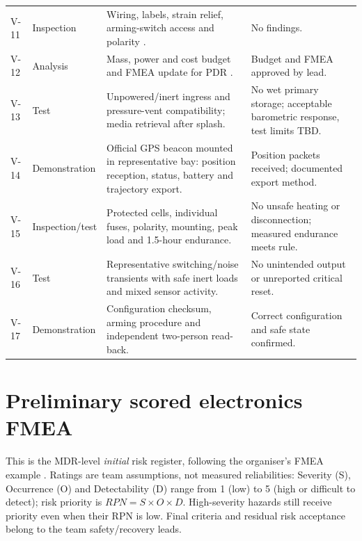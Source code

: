 \begin{longtable}{@{}L{11mm}L{23mm}L{70mm}L{42mm}@{}}
V-11 & Inspection & Wiring, labels, strain relief, arming-switch access and polarity \cite{rtc2027app03}. & No findings.\\
V-12 & Analysis & Mass, power and cost budget and FMEA update for PDR \cite{rtc2027app12}. & Budget and FMEA approved by lead.\\
V-13 & Test & Unpowered/inert ingress and pressure-vent compatibility; media retrieval after splash. & No wet primary storage; acceptable barometric response, test limits TBD.\\
V-14 & Demonstration & Official GPS beacon mounted in representative bay: position reception, status, battery and trajectory export. & Position packets received; documented export method.\\
V-15 & Inspection/test & Protected cells, individual fuses, polarity, mounting, peak load and 1.5-hour endurance. & No unsafe heating or disconnection; measured endurance meets rule.\\
V-16 & Test & Representative switching/noise transients with safe inert loads and mixed sensor activity. & No unintended output or unreported critical reset.\\
V-17 & Demonstration & Configuration checksum, arming procedure and independent two-person read-back. & Correct configuration and safe state confirmed.\\
\end{longtable}
\normalsize


\section{Preliminary scored electronics FMEA}
\label{sec:fmea}
This is the MDR-level \emph{initial} risk register, following the organiser's FMEA example \cite{rtc2027app12}. Ratings are team assumptions, not measured reliabilities: Severity (S), Occurrence (O) and Detectability (D) range from 1 (low) to 5 (high or difficult to detect); risk priority is $RPN=S\times O\times D$. High-severity hazards still receive priority even when their RPN is low. Final criteria and residual risk acceptance belong to the team safety/recovery leads.

